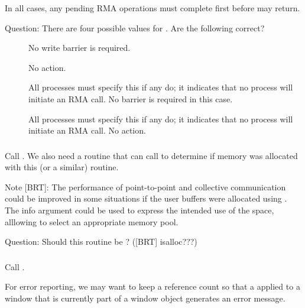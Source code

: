 \documentclass{article}
\begin{document}
In all cases, any pending RMA operations must complete first before
 may return.

Question:  There are four possible  values for
.  Are the following correct?
\begin{description}
\item[]No write barrier is required.
\item[]No action.
\item[]All processes must specify this if any do;
  it 
  indicates that no process will initiate an RMA call.  No barrier is required
  in this case.
\item[]All processes must specify this if any do;
  it indicates that no process will initiate an RMA call.  No action.
\end{description}

\subsubsection{}
Call .  We also need a routine that
 can call to determine if memory was allocated with
this (or a similar) routine.

Note [BRT]: The performance of point-to-point and collective communication
could be improved in some situations if the user buffers were
allocated using .  The info argument could be
used to express the intended use of the space, alllowing
 to select an appropriate memory pool.

Question: Should this routine be ?  ([BRT] isalloc???)

\subsubsection{}
Call .

For error reporting, we may want to keep a reference count so that a
 applied to a window that is currently part of a window
object generates an error message.
\end{document}
